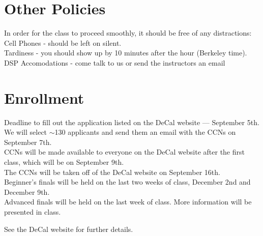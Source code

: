 \documentclass[11pt]{article}
\begin{document}
\section*{Other Policies}
In order for the class to proceed smoothly, it should be free of any distractions: \\
Cell Phones - should be left on silent.\\
Tardiness - you should show up by 10 minutes after the hour (Berkeley time).\\
DSP Accomodations - come talk to us or send the instructors an email

\section*{Enrollment}
Deadline to fill out the application listed on the DeCal website — September 5th.\\
We will select $\sim$130 applicants and send them an email with the CCNs on September 7th.\\
CCNs will be made available to everyone on the DeCal website after the first class, which will be on September 9th.\\
The CCNs will be taken off of the DeCal website on September 16th.\\
Beginner’s finals will be held on the last two weeks of class, December 2nd and December 9th.\\
Advanced finals will be held on the last week of class. More information will be presented in class.

See the DeCal website for further details.
\end{document}
